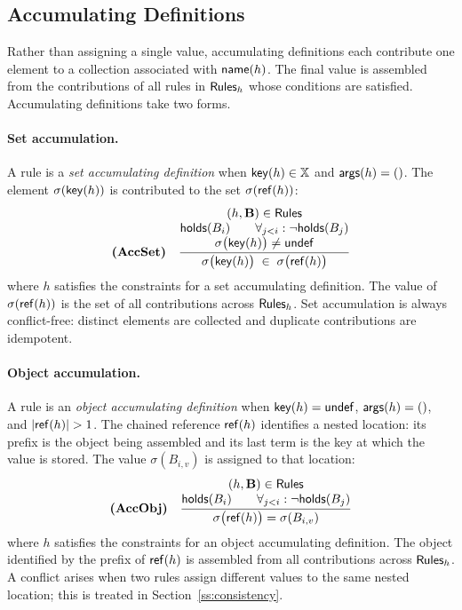 
\subsection{Accumulating Definitions}
\label{ss:accum}


Rather than assigning a single value, accumulating definitions each contribute one element
to a collection associated with $\mathsf{name}(h)$.
The final value is assembled from the contributions of all rules in $\mathsf{Rules}_h$ whose
conditions are satisfied.
Accumulating definitions take two forms.

\paragraph{Set accumulation.}
A rule is a \emph{set accumulating definition} when $\mathsf{key}(h) \in \mathbb{X}$ and $\mathsf{args}(h) = ()$.
The element $\sigma(\mathsf{key}(h))$ is contributed to the set $\sigma(\mathsf{ref}(h))$:
\[
\textbf{(AccSet)}\quad
\inferrule{
  (h, \mathbf{B}) \in \Rules \\
  \Holds(B_i) \qquad \forall_{j < i} : \neg\Holds(B_j) \\
  \sigma\bigl(\RuleKey(h)\bigr) \neq \Undef
}{
  \sigma\bigl(\RuleKey(h)\bigr) \;\in\; \sigma\bigl(\RuleRef(h)\bigr)
}
\]
where $h$ satisfies the constraints for a set accumulating definition.
The value of $\sigma(\mathsf{ref}(h))$ is the set of all contributions across $\mathsf{Rules}_h$.
Set accumulation is always conflict-free: distinct elements are collected and duplicate
contributions are idempotent.

\paragraph{Object accumulation.}
A rule is an \emph{object accumulating definition} when $\mathsf{key}(h) = \mathsf{undef}$,
$\mathsf{args}(h) = ()$, and $|\mathsf{ref}(h)| > 1$.
The chained reference $\mathsf{ref}(h)$ identifies a nested location: its prefix is the
object being assembled and its last term is the key at which the value is stored.
The value $\sigma(B_{i,v})$ is assigned to that location:
\[
\textbf{(AccObj)}\quad
\inferrule{
  (h, \mathbf{B}) \in \Rules \\
  \Holds(B_i) \qquad \forall_{j < i} : \neg\Holds(B_j)
}{
  \sigma\bigl(\RuleRef(h)\bigr) = \sigma(B_{i,v})
}
\]
where $h$ satisfies the constraints for an object accumulating definition.
The object identified by the prefix of $\mathsf{ref}(h)$ is assembled from all contributions
across $\mathsf{Rules}_h$.
A conflict arises when two rules assign different values to the same nested location;
this is treated in Section~\ref{ss:consistency}.

